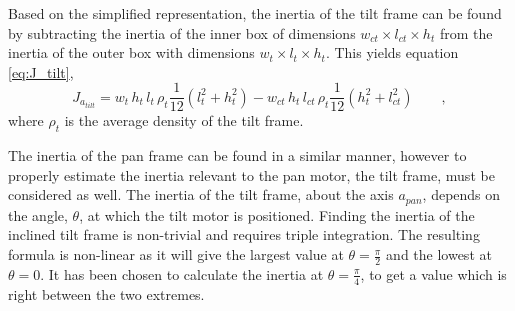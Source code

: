 \documentclass[../../main.tex]{subfiles}
\begin{document}

Based on the simplified representation, the inertia of the tilt frame can be found by subtracting the inertia of the inner box of dimensions $w_{ct}\times l_{ct}\times h_t$ from the inertia of the outer box with dimensions $w_t\times l_t\times h_t$. This yields equation \ref{eq:J_tilt},
\begin{equation} \label{eq:J_tilt}
    J_{a_{tilt}} =  w_{t} \,h_{t}\, l_{t}\,\rho_{t}\frac{1}{12}(l_{t}^2+h_{t}^2)-w_{ct}\, h_{t} \, l_{ct} \, \rho_{t}\frac{1}{12}(h_{t}^2+l_{ct}^2) \qquad ,
\end{equation}
where $\rho_t$ is the average density of the tilt frame.

The inertia of the pan frame can be found in a similar manner, however to properly estimate the inertia relevant to the pan motor, the tilt frame, must be considered as well. The inertia of the tilt frame, about the axis $a_{pan}$, depends on the angle, $\theta$, at which the tilt motor is positioned. Finding the inertia of the inclined tilt frame is non-trivial and requires triple integration. 
The resulting formula is non-linear as it will give the largest value at $\theta=\frac{\pi}{2}$ and the lowest at $\theta=0$. It has been chosen to calculate the inertia at $\theta = \frac{\pi}{4}$, to get a value which is right between the two extremes. 
\end{document}
